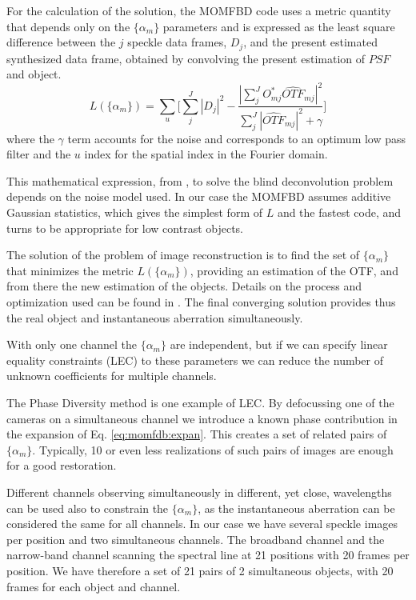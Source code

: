 For the calculation of the solution, the MOMFBD code uses a metric quantity that depends only on the $\{ \alpha_{m} \} $ parameters and is expressed as the least square difference between the $j$ speckle data frames, $D_{j} $, and the present estimated synthesized data frame, obtained by convolving the present estimation of $PSF$  and object. 
\begin{equation}
L(\{\alpha_{m}\})= \sum_{u} \Big[ \sum_{j}^{J} |D_{j}|^2 - \frac{|\sum_{j}^{J}O^{*}_{mj}\widehat{OTF}_{mj}|^2}{\sum_{j}^{J}|\widehat{OTF}_{mj}|^{2}+\gamma}\Big]
\end{equation} 
where the $\gamma$ term accounts for the noise and corresponds to an optimum low pass filter \citep{Lofdahl:2002qy} and the $u$ index for the spatial index in the Fourier domain.

This mathematical expression, from \cite{1996ApJ...466.1087P}, to solve the blind deconvolution problem depends on the noise model used. In our case the MOMFBD assumes additive Gaussian statistics, which gives the simplest form of $L$ and the fastest code, and turns to be appropriate for low contrast objects.

The solution of the problem of image reconstruction is to find the set of $\{\alpha_{m} \}$ that minimizes the metric $L(\{\alpha_{m}\})$, providing an estimation of the OTF, and from there the new estimation of the objects. Details on the process and optimization used can be found in \cite{Lofdahl:2002qy}. The final converging solution provides thus the real object and instantaneous aberration simultaneously.

With only one channel the $\{\alpha_{m} \}$ are independent, but if we can specify linear equality constraints (LEC) to these parameters we can reduce the number of unknown coefficients for multiple channels.

The Phase Diversity method is one example of LEC. By defocussing one of the cameras on a simultaneous channel we introduce a known phase contribution in the expansion of Eq. \ref{eq:momfdb:expan}. This creates a set of related pairs of $\{\alpha_{m} \}$.  Typically, 10 or even less realizations of such pairs of images are enough for a good restoration.

Different channels observing simultaneously  in different, yet close, wavelengths can be used also to constrain the $\{\alpha_{m} \}$, as the instantaneous aberration can be considered the same for all channels. In our case we have several speckle images per position and two simultaneous channels. The broadband channel and the narrow-band channel scanning the spectral line at  21 positions with 20 frames per position. We have therefore a set of 21 pairs of 2 simultaneous objects, with 20 frames for each object and channel.

